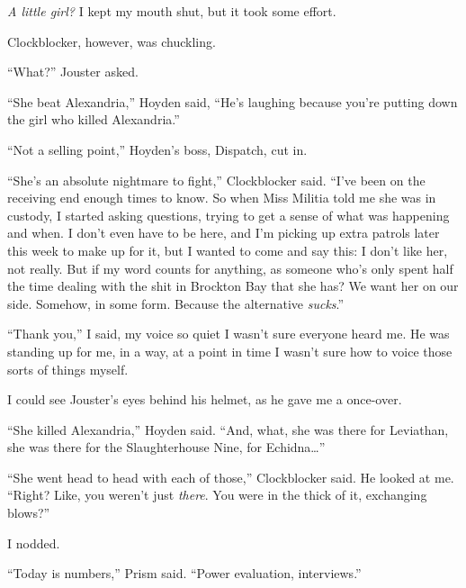 \emph{A little girl?}  I kept my mouth shut, but it took some effort.



Clockblocker, however, was chuckling.



``What?'' Jouster asked.



``She beat Alexandria,'' Hoyden said, ``He's laughing because you're putting down the girl who killed Alexandria.''



``Not a selling point,'' Hoyden's boss, Dispatch, cut in.



``She's an absolute nightmare to fight,'' Clockblocker said.  ``I've been on the receiving end enough times to know.  So when Miss Militia told me she was in custody, I started asking questions, trying to get a sense of what was happening and when.  I don't even have to be here, and I'm picking up extra patrols later this week to make up for it, but I wanted to come and say this:  I don't like her, not really.  But if my word counts for anything, as someone who's only spent half the time dealing with the shit in Brockton Bay that she has?  We want her on our side.  Somehow, in some form.  Because the alternative \emph{sucks}.''



``Thank you,'' I said, my voice so quiet I wasn't sure everyone heard me.  He was standing up for me, in a way, at a point in time I wasn't sure how to voice those sorts of things myself.



I could see Jouster's eyes behind his helmet, as he gave me a once-over.



``She killed Alexandria,'' Hoyden said.  ``And, what, she was there for Leviathan, she was there for the Slaughterhouse Nine, for Echidna\ldots''



``She went head to head with each of those,'' Clockblocker said.  He looked at me.  ``Right?  Like, you weren't just \emph{there}.  You were in the thick of it, exchanging blows?''



I nodded.



``Today is numbers,'' Prism said.  ``Power evaluation, interviews.''



